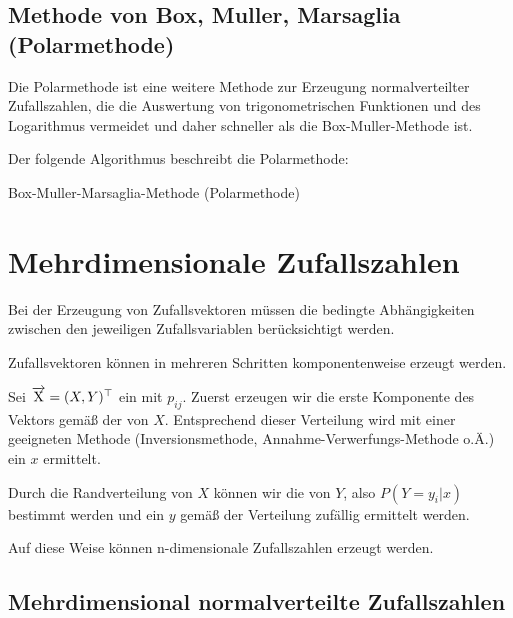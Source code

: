 \subsection{Methode von Box, Muller, Marsaglia (Polarmethode)}

Die Polarmethode ist eine weitere Methode zur Erzeugung normalverteilter
Zufallszahlen, die die Auswertung von trigonometrischen Funktionen und des
Logarithmus vermeidet und daher schneller als die Box-Muller-Methode ist.

Der folgende Algorithmus beschreibt die Polarmethode:
\begin{algorithm}[h!]


\caption{Box-Muller-Marsaglia-Methode (Polarmethode)}
\label{algo:box-muller-marsaglia}
\end{algorithm}

\section{Mehrdimensionale Zufallszahlen}

Bei der Erzeugung von Zufallsvektoren müssen die bedingte Abhängigkeiten
zwischen den jeweiligen Zufallsvariablen berücksichtigt werden.

Zufallsvektoren können in mehreren Schritten komponentenweise erzeugt werden.

Sei $\overrightarrow{\mathrm{X}} = (X,Y)^\top$ ein  mit
 $p_{ij}$. Zuerst erzeugen
wir die erste Komponente des Vektors gemäß der 
von $X$. Entsprechend dieser Verteilung wird mit einer geeigneten Methode
(Inversionsmethode, Annahme-Verwerfungs-Methode o.Ä.) ein $x$ ermittelt.

Durch die Randverteilung von $X$ können wir die  von $Y$, also $P(Y=y_i|x)$ bestimmt werden und ein
$y$ gemäß der Verteilung zufällig ermittelt werden.

Auf diese Weise können n-dimensionale Zufallszahlen erzeugt werden.

\subsection{Mehrdimensional normalverteilte Zufallszahlen}


